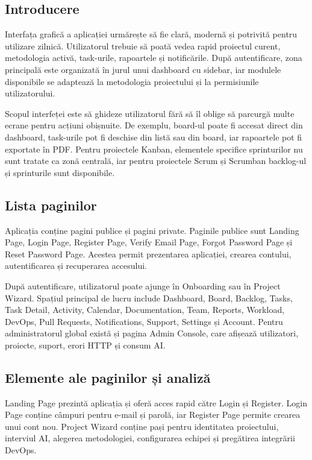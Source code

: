\documentclass[12pt,a4paper]{report}
\begin{document}
\subsection{Introducere}
Interfața grafică a aplicației urmărește să fie clară, modernă și potrivită pentru utilizare zilnică. Utilizatorul trebuie să poată vedea rapid proiectul curent, metodologia activă, task-urile, rapoartele și notificările. După autentificare, zona principală este organizată în jurul unui dashboard cu sidebar, iar modulele disponibile se adaptează la metodologia proiectului și la permisiunile utilizatorului.

Scopul interfeței este să ghideze utilizatorul fără să îl oblige să parcurgă multe ecrane pentru acțiuni obișnuite. De exemplu, board-ul poate fi accesat direct din dashboard, task-urile pot fi deschise din listă sau din board, iar rapoartele pot fi exportate în PDF. Pentru proiectele Kanban, elementele specifice sprinturilor nu sunt tratate ca zonă centrală, iar pentru proiectele Scrum și Scrumban backlog-ul și sprinturile sunt disponibile.

\subsection{Lista paginilor}
Aplicația conține pagini publice și pagini private. Paginile publice sunt Landing Page, Login Page, Register Page, Verify Email Page, Forgot Password Page și Reset Password Page. Acestea permit prezentarea aplicației, crearea contului, autentificarea și recuperarea accesului.

După autentificare, utilizatorul poate ajunge în Onboarding sau în Project Wizard. Spațiul principal de lucru include Dashboard, Board, Backlog, Tasks, Task Detail, Activity, Calendar, Documentation, Team, Reports, Workload, DevOps, Pull Requests, Notifications, Support, Settings și Account. Pentru administratorul global există și pagina Admin Console, care afișează utilizatori, proiecte, suport, erori HTTP și consum AI.

\subsection{Elemente ale paginilor și analiză}
Landing Page prezintă aplicația și oferă acces rapid către Login și Register. Login Page conține câmpuri pentru e-mail și parolă, iar Register Page permite crearea unui cont nou. Project Wizard conține pași pentru identitatea proiectului, interviul AI, alegerea metodologiei, configurarea echipei și pregătirea integrării DevOps.
\end{document}
